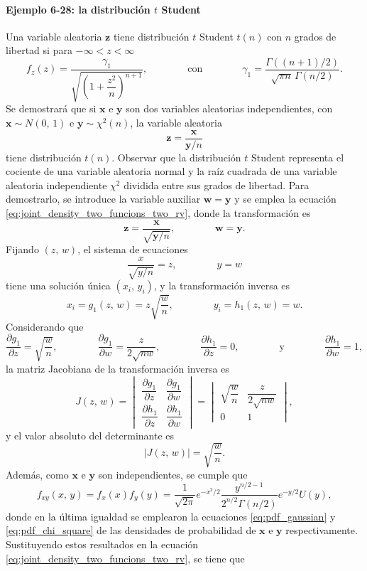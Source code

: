 \documentclass[a4paper]{report}
\newcommand{\x}{\mathbf{x}}
\newcommand{\y}{\mathbf{y}}
\newcommand{\w}{\mathbf{w}}
\newcommand{\z}{\mathbf{z}}
\begin{document}
\paragraph{Ejemplo 6-28: la distribución \(t\) Student} Una variable aleatoria \(\z\) tiene distribución \(t\) Student \(t(n)\) con \(n\) grados de libertad si para \(-\infty<z<\infty\)
\[
 f_z(z)=\dfrac{\gamma_1}{\sqrt{\left(1+\dfrac{z^2}{n}\right)^{n+1}}},
  \qquad\qquad\textrm{con}\qquad\qquad
 \gamma_1=\frac{\Gamma((n+1)/2)}{\sqrt{\pi n}\,\Gamma(n/2)}.
\]
Se demostrará que si \(\x\) e \(\y\) son dos variables aleatorias independientes, con \(\x\sim N(0,\,1)\) e \(\y\sim\chi^2(n)\), la variable aleatoria 
\[
 \z=\frac{\x}{\y/n}
\]
tiene distribución \(t(n)\). Observar que la distribución \(t\) Student representa el cociente de una variable aleatoria normal y la raíz cuadrada de una variable aleatoria independiente \(\chi^2\) dividida entre sus grados de libertad. Para demostrarlo, se introduce la variable auxiliar \(\w=\y\) y se emplea la ecuación \ref{eq:joint_density_two_funcions_two_rv}, donde la transformación es
\[
 \z=\frac{\x}{\sqrt{\y/n}},\qquad\qquad \w=\y.
\]
Fijando \((z,\,w)\), el sistema de ecuaciones
\[
 \frac{x}{\sqrt{y/n}}=z,\qquad\qquad y=w
\]
tiene una solución única \((x_i,\,y_i)\), y la transformación inversa es
\[
 x_i=g_1(z,\,w)=z\sqrt{\frac{w}{n}},\qquad\qquad y_i=h_1(z,\,w)=w.
\]
Considerando que 
\[
 \frac{\partial g_1}{\partial z}=\sqrt{\frac{w}{n}},\qquad\qquad\frac{\partial g_1}{\partial w}=\frac{z}{2\sqrt{nw}},\qquad\qquad \frac{\partial h_1}{\partial z}=0,\qquad\qquad\textrm{y}\qquad\qquad\frac{\partial h_1}{\partial w}=1,
\]
la matriz Jacobiana de la transformación inversa es
\begingroup
\renewcommand*{\arraystretch}{2.2}
\[
 J(z,\,w)=
 \begin{vmatrix}
    \dfrac{\partial g_1}{\partial z} & \dfrac{\partial g_1}{\partial w} \\
    \dfrac{\partial h_1}{\partial z} & \dfrac{\partial h_1}{\partial w}
\end{vmatrix}=
 \begin{vmatrix}
    \sqrt{\dfrac{w}{n}} & \dfrac{z}{2\sqrt{nw}} \\
    0 & 1
\end{vmatrix},
\]
\endgroup
y el valor absoluto del determinante es
\[
 |J(z,\,w)|=\sqrt{\dfrac{w}{n}}.
\]
Además, como \(\x\) e \(\y\) son independientes, se cumple que 
\[
 f_{xy}(x,\,y)=f_x(x)f_y(y)=\frac{1}{\sqrt{2\pi}}e^{-x^2/2}\frac{y^{n/2-1}}{2^{n/2}\Gamma(n/2)}e^{-y/2}U(y),
\]
donde en la última igualdad se emplearon la ecuaciones \ref{eq:pdf_gaussian} y \ref{eq:pdf_chi_square} de las densidades de probabilidad de \(\x\) e \(\y\) respectivamente. Sustituyendo estos resultados en la ecuación \ref{eq:joint_density_two_funcions_two_rv}, se tiene que
\end{document}
